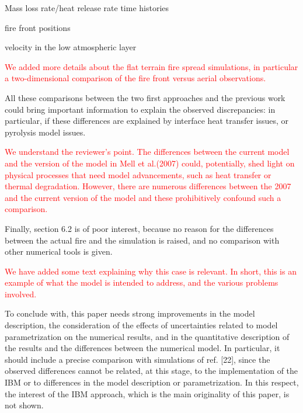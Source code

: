 \documentclass[12pt]{article}
\newcommand\hl[1]{\textcolor{red}{#1}}
\begin{document}
Mass loss rate/heat release rate time histories

fire front positions

velocity in the low atmospheric layer

\hl{We added more details about the flat terrain fire spread simulations, in particular a two-dimensional comparison of the fire front versus aerial observations.}

All these comparisons between the two first approaches and the previous work could bring
important information to explain the observed discrepancies: in particular, if these differences
are explained by interface heat transfer issues, or pyrolysis model issues.

\hl{We understand the reviewer's point. The differences between the current model and the version of the model in Mell et al.(2007) could, potentially, shed light on physical processes that need model advancements, such as heat transfer or thermal degradation. However, there are numerous differences between the 2007 and the current version of the model and these prohibitively confound such a comparison.}

Finally, section 6.2 is of poor interest, because no reason for the differences between the actual
fire and the simulation is raised, and no comparison with other numerical tools is given.

\hl{We have added some text explaining why this case is relevant. In short, this is an example of what the model is intended to address, and the various problems involved.}

To conclude with, this paper needs strong improvements in the model description, the
consideration of the effects of uncertainties related to model parametrization on the numerical
results, and in the quantitative description of the results and the differences between the
numerical model. In particular, it should include a precise comparison with simulations of ref.
[22], since the observed differences cannot be related, at this stage, to the implementation of the
IBM or to differences in the model description or parametrization. In this respect, the interest of
the IBM approach, which is the main originality of this paper, is not shown.
\end{document}
